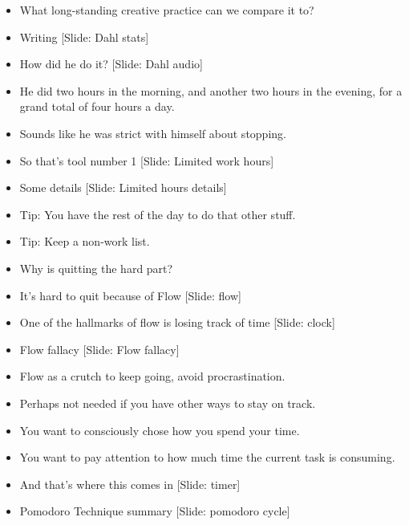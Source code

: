 \documentclass[12pt]{article}
\begin{document}
{\begin{itemize}
\item What long-standing creative practice can we compare it to?

\item Writing [Slide:  Dahl stats]

\item How did he do it? [Slide:  Dahl audio]

\item He did two hours in the morning, and another two hours in the evening, for a grand total of four hours a day.

\item Sounds like he was strict with himself about stopping.

\item So that's tool number 1 [Slide:  Limited work hours]

\item Some details [Slide: Limited hours details]

\item Tip:  You have the rest of the day to do that other stuff.

\item Tip:  Keep a non-work list.

\item Why is quitting the hard part?

\item It's hard to quit because of Flow [Slide: flow]

\item One of the hallmarks of flow is losing track of time [Slide: clock]

\item Flow fallacy [Slide: Flow fallacy]

\item Flow as a crutch to keep going, avoid procrastination.

\item Perhaps not needed if you have other ways to stay on track.

\item You want to consciously chose how you spend your time.

\item You want to pay attention to how much time the current task is consuming.

\item And that's where this comes in [Slide:  timer]

\item Pomodoro Technique summary [Slide: pomodoro cycle]


\end{itemize}}
\end{document}
